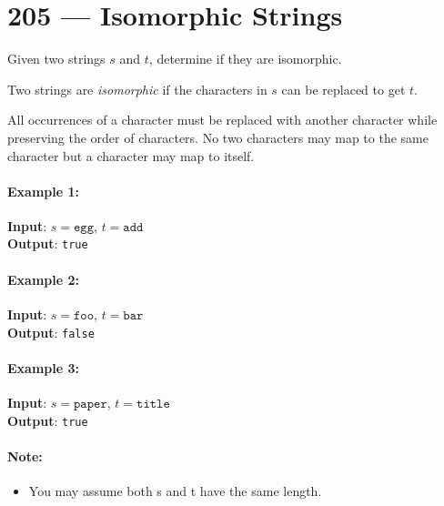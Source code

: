 \section{205 --- Isomorphic Strings}
Given two strings $s$ and $t$, determine if they are isomorphic.
\par
Two strings are \textit{isomorphic} if the characters in $s$ can be replaced to get $t$.
\par
All occurrences of a character must be replaced with another character while preserving the order of characters. No two characters may map to the same character but a character may map to itself.
\paragraph{Example 1:}
\begin{flushleft}
\textbf{Input}: $s = \texttt{egg}$, $t = \texttt{add}$
\\
\textbf{Output}: \texttt{true}
\end{flushleft}

\paragraph{Example 2:}
\begin{flushleft}
\textbf{Input}: $s = \texttt{foo}$, $t = \texttt{bar}$
\\
\textbf{Output}: \texttt{false}
\end{flushleft}

\paragraph{Example 3:}
\begin{flushleft}
\textbf{Input}: $s = \texttt{paper}$, $t = \texttt{title}$
\\
\textbf{Output}: \texttt{true}
\end{flushleft}
\paragraph{Note:}
\begin{itemize}
    \item You may assume both s and t have the same length.
\end{itemize}
